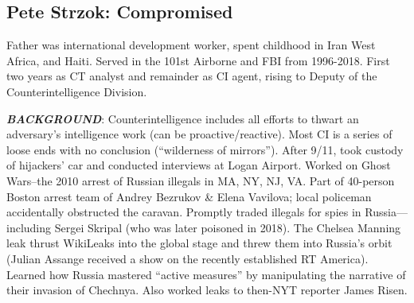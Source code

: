 \documentclass[
]{article}
\begin{document}
\hypertarget{pete-strzok-compromised}{%
\subsection{Pete Strzok: Compromised}\label{pete-strzok-compromised}}

Father was international development worker, spent childhood in Iran
West Africa, and Haiti. Served in the 101st Airborne and FBI from
1996-2018. First two years as CT analyst and remainder as CI agent,
rising to Deputy of the Counterintelligence Division.

\textbf{\emph{BACKGROUND}}: Counterintelligence includes all efforts to
thwart an adversary's intelligence work (can be proactive/reactive).
Most CI is a series of loose ends with no conclusion (``wilderness of
mirrors''). After 9/11, took custody of hijackers' car and conducted
interviews at Logan Airport. Worked on Ghost Wars--the 2010 arrest of
Russian illegals in MA, NY, NJ, VA. Part of 40-person Boston arrest team
of Andrey Bezrukov \& Elena Vavilova; local policeman accidentally
obstructed the caravan. Promptly traded illegals for spies in
Russia---including Sergei Skripal (who was later poisoned in 2018). The
Chelsea Manning leak thrust WikiLeaks into the global stage and threw
them into Russia's orbit (Julian Assange received a show on the recently
established RT America). Learned how Russia mastered ``active measures''
by manipulating the narrative of their invasion of Chechnya. Also worked
leaks to then-NYT reporter James Risen.
\end{document}
